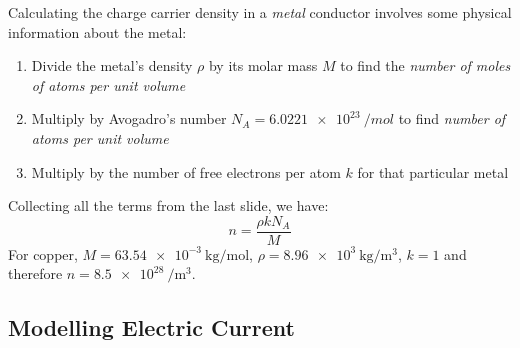 Calculating the charge carrier density in a \emph{metal} conductor involves
some physical information about the metal:
\begin{enumerate}
\item Divide the metal's density $\rho$ by its molar mass $M$ to find the
  \emph{number of moles of atoms per unit volume}
\item Multiply by Avogadro's number $N_A=\SI{6.0221e23}{\per mol}$ to find
  \emph{number of atoms per unit volume}
\item Multiply by the number of free electrons per atom $k$ for that
  particular metal
\end{enumerate}
Collecting all the terms from the last slide, we have:  
\begin{equation}
  \boxed{n=\frac{\rho kN_A}M}
\end{equation}
For copper, $M=\SI{63.54e-3}{\kilo\gram\per\mol}$,
$\rho=\SI{8.96e3}{\kilo\gram\per\metre\cubed}$, $k=1$ and therefore
$n=\SI{8.5e28}{\per\metre\cubed}$.
%
%

\subsection{Modelling Electric Current}

